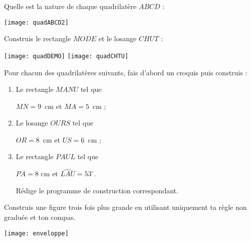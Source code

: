 

\begin{exercice}[Reconnaître]
Quelle est la nature de chaque quadrilatère $ABCD$ :
\begin{center} \texttt{[image: quadABCD2]} \end{center}
\end{exercice}


\begin{exercice}[Constructions]
Construis le rectangle $MODE$ et le losange $CHUT$ :

\qquad \texttt{[image: quadDEMO]} \qquad \texttt{[image: quadCHTU]}
\end{exercice}



\begin{exercice}
Pour chacun des quadrilatères suivants, fais d’abord un croquis puis construis :
\begin{enumerate}
 \item Le rectangle $MANU$ tel que 
 
 $MN = 9$ cm et $MA = 5$ cm ;
 \item Le losange $OURS$ tel que 
 
 $OR = 8$ cm et $US = 6$ cm ;
 \item Le rectangle $PAUL$ tel que 
 
 $PA = 8$ cm et $\widehat{LAU} = 53^\circ$. 
 
 Rédige le programme de construction correspondant.
 \end{enumerate}
\end{exercice}


\begin{exercice}
\vspace{1em}
\begin{minipage}[c]{0.50\linewidth}
Construis une figure trois fois plus grande en utilisant uniquement ta règle non graduée et ton compas.
 \end{minipage} \hfill%
 \begin{minipage}[c]{0.42\linewidth}
  \texttt{[image: enveloppe]}
  \end{minipage} \\
\end{exercice}


\vspace{1em}

